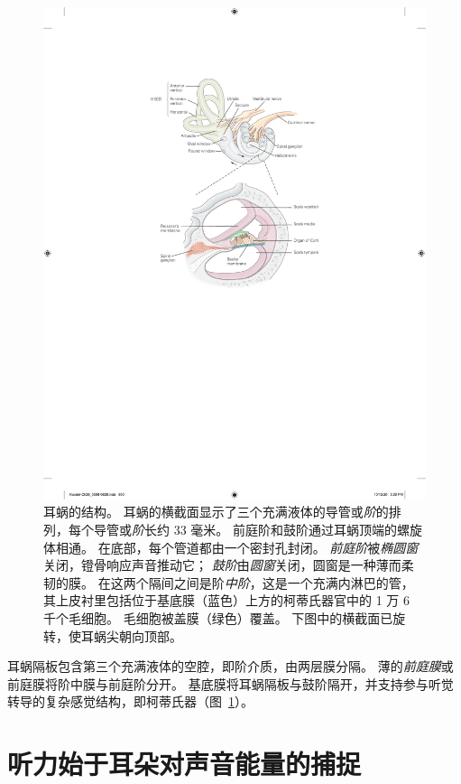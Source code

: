 \begin{figure}[htbp]
	\centering
	\includegraphics[width=0.85\linewidth]{chap26/fig_26_2}
	\caption{耳蜗的结构。
		耳蜗的横截面显示了三个充满液体的导管或\textit{阶}的排列，每个导管或\textit{阶}长约 33 毫米。
		前庭阶和鼓阶通过耳蜗顶端的螺旋体相通。
		在底部，每个管道都由一个密封孔封闭。
		\textit{前庭阶}被\textit{椭圆窗}关闭，镫骨响应声音推动它；
		\textit{鼓阶}由\textit{圆窗}关闭，圆窗是一种薄而柔韧的膜。
		在这两个隔间之间是阶\textit{中阶}，这是一个充满内淋巴的管，其上皮衬里包括位于基底膜（蓝色）上方的柯蒂氏器官中的 1 万 6 千个毛细胞。
		毛细胞被盖膜（绿色）覆盖。
		下图中的横截面已旋转，使耳蜗尖朝向顶部。}
	\label{fig:26_2}
\end{figure}


耳蜗隔板包含第三个充满液体的空腔，即阶介质，由两层膜分隔。
薄的\textit{前庭膜}或前庭膜将阶中膜与前庭阶分开。
基底膜将耳蜗隔板与鼓阶隔开，并支持参与听觉转导的复杂感觉结构，即柯蒂氏器（图~\ref{fig:26_2}）。



\section{听力始于耳朵对声音能量的捕捉}

